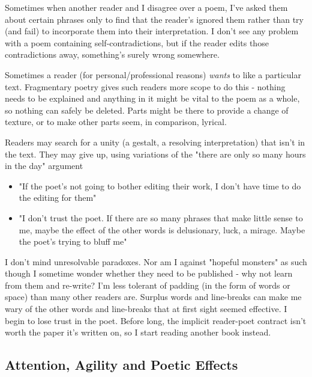 \documentclass[11pt]{article}
\begin{document}
Sometimes when another reader and I disagree over a poem, I've asked them about certain phrases only to find that the reader's ignored them rather than try (and fail) to incorporate them into their interpretation. I don't see any problem with a poem containing self-contradictions, but if the reader edits those contradictions away, something's surely wrong somewhere.

Sometimes a reader (for personal/professional reasons) \textit{wants} to like a particular text. Fragmentary poetry gives such readers more scope to do this - nothing needs to be explained and anything in it might be vital to the poem as a whole, so nothing can safely be deleted. Parts might be there to provide a change of texture, or to make other parts seem, in comparison, lyrical. 

Readers may search for a unity (a gestalt, a resolving interpretation) that isn't in the text. They may give up, using variations of the "there are only so many hours in the day" argument

\begin{itemize}
\item "If the poet's not going to bother editing their work, I don't have time to do the editing for them"
\item "I don't trust the poet. If there are so many phrases that make little sense to me, maybe the effect of the other words is delusionary, luck, a mirage. Maybe the poet's trying to bluff me"
\end{itemize}

I don't mind unresolvable paradoxes. Nor am I against "hopeful monsters" as such though I sometime wonder whether they need to be published - why not learn from them and re-write? I'm less tolerant of padding (in the form of words or space) than many other readers are. Surplus words and line-breaks can make me wary of the other words and line-breaks that at first sight seemed effective. I begin to lose trust in the poet. Before long, the implicit reader-poet contract isn't worth the paper it's written on, so I start reading another book instead.

\newpage\subsection{Attention, Agility and Poetic Effects}
\end{document}
